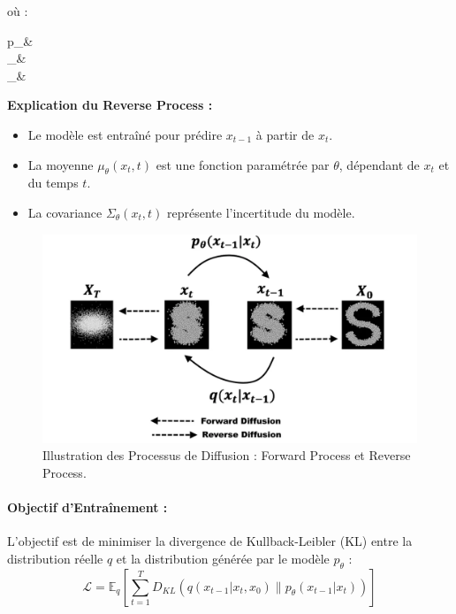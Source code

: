 où :
\begin{conditions}
	p_\theta &  \\
	\mu_\theta &  \\
	\Sigma_\theta & 
\end{conditions}

\textbf{Explication du Reverse Process :}

\begin{itemize}
	\item Le modèle est entraîné pour prédire \( x_{t-1} \) à partir de \( x_t \).
	\item La moyenne \( \mu_\theta(x_t, t) \) est une fonction paramétrée par \( \theta
	      \), dépendant de \( x_t \) et du temps \( t \).
	\item La covariance \( \Sigma_\theta(x_t, t) \) représente l'incertitude du modèle.
\end{itemize}

\begin{figure}[hbt!]
	\centering
	\includegraphics[width=12cm]{images_pfe/diffusion_process.png}
	\caption{Illustration des Processus de Diffusion : Forward Process et Reverse Process.}
	\label{fig:markov}
\end{figure}
\FloatBarrier

\paragraph{Objectif d'Entraînement :}
L'objectif est de minimiser la divergence de Kullback-Leibler (KL) entre la
distribution réelle \( q \) et la distribution générée par le modèle \(
p_\theta \) :
\[
	\mathcal{L} = \mathbb{E}_q \left[ \sum_{t=1}^T D_{KL}(q(x_{t-1} | x_t, x_0) \| p_\theta(x_{t-1} | x_t)) \right]
\]

